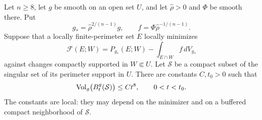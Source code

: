 \begin{lemma}
\label{lem:rpi:bw-quantitative}
Let $n\ge8$, let $g$ be smooth on an open set $U$, and let
$\widehat\rho>0$ and $\Phi$ be smooth there. Put
\[
 g_* =\widehat\rho^{2/(n-1)}g,
 \qquad f=\Phi\widehat\rho^{-1/(n-1)}.
\]
Suppose that a locally finite-perimeter set $E$ locally minimizes
\[
 \mathcal F(E;W)
   =P_{g_*}(E;W)-\int_{E\cap W}f\,dV_{g_*}
\]
against changes compactly supported in $W\Subset U$. Let
$\mathcal S$ be a compact subset of the singular set of its
perimeter support in $U$. There are constants $C,t_0>0$ such that
\begin{equation}\label{eq:rpi:bw-tube}
 \operatorname{Vol}_g\bigl(B_t^g(\mathcal S)\bigr)\le C t^8,
 \qquad 0<t<t_0.
\end{equation}
The constants are local: they may depend on the minimizer and on
a buffered compact neighborhood of $\mathcal S$.
\end{lemma}
